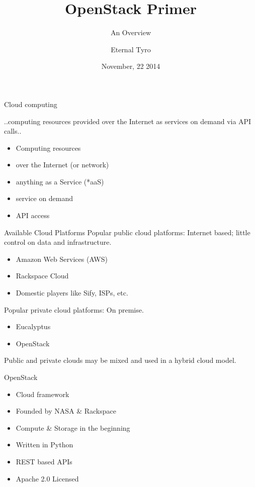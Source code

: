 \documentclass{beamer}
\title[OpenStack]{OpenStack Primer}
\subtitle[Overview]{An Overview}
\author[EternalTyro]{Eternal Tyro}
\institute[A]{
      Dummy Company\\
      OpenStack India Meetup, Chennai\\[1ex]
      \texttt{http://xxxyyyzzz.com}
}
\date{November, 22 2014}
\begin{document}
\begin{frame}[plain]
  \titlepage
\end{frame}

\begin{frame}{Cloud computing}

\begin{definition}
 ..computing resources provided over the Internet as services on demand via API calls..
\end{definition}
\pause

\begin{itemize}
 \item Computing resources
 \pause
 \item over the Internet (or network)
 \pause
 \item anything as a Service (*aaS)
 \pause
 \item service on demand
 \pause
 \item API access
\end{itemize}
\end{frame}

\begin{frame}{Available Cloud Platforms}
Popular public cloud platforms: Internet based; little control on data and infrastructure.
\begin{itemize}
 \item Amazon Web Services (AWS)
 \item Rackspace Cloud
 \item Domestic players like Sify, ISPs, etc.
\end{itemize}
\pause
Popular private cloud platforms: On premise.
\begin{itemize}
 \item Eucalyptus
 \item OpenStack
\end{itemize}
\pause
Public and private clouds may be mixed and used in a hybrid cloud model.
\end{frame}

\begin{frame}{OpenStack}
\begin{itemize}
 \item Cloud framework
 \item Founded by NASA \& Rackspace
 \item Compute \& Storage in the beginning
 \item Written in Python
 \item REST based APIs
 \item Apache 2.0 Licensed
\end{itemize}
\end{frame}
\end{document}
